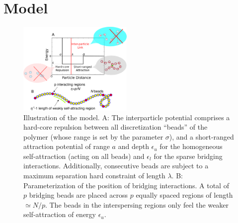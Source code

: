 \documentclass[a4paper,12pt,pre,superscriptaddress]{revtex4}
\begin{document}
\section{Model}

\begin{figure}
  \centering
 \includegraphics[width=0.49\textwidth]{fig1}
 \caption{Illustration of the model. A: The interparticle potential
   comprises a hard-core repulsion between all discretization
   ``beads'' of the polymer (whose range is set by the parameter
   $\sigma$), and a short-ranged attraction potential of range
   $a$ and depth $\epsilon_u$ for the homogeneous self-attraction
   (acting on all beads) and $\epsilon_l$ for the sparse bridging
   interactions. Additionally, consecutive beads are subject to a
   maximum separation hard constraint of length $\lambda$.
   B: Parameterization of the position of bridging interactions. A
   total of $p$ bridging beads are placed across $p$ equally spaced
   regions of length $\simeq N /p$. The beads in the interspersing
   regions only feel the weaker self-attraction of energy
   $\epsilon_u$. }
  \label{fig:1}
\end{figure}
\end{document}

